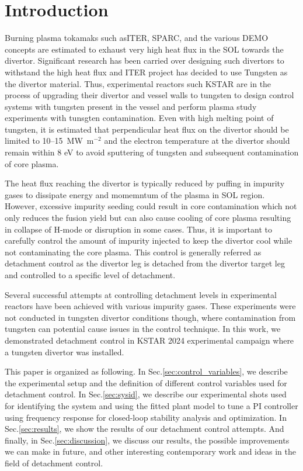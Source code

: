 
\section{Introduction}
\label{sec:introduction}

Burning plasma tokamaks such asITER\cite{Holtkamp_2007_FED}, SPARC\cite{Creely_2020_JPP}, and the various DEMO concepts are estimated to exhaust very high heat flux in the \ac{SOL} towards the divertor. Significant research has been carried over designing such divertors to withstand the high heat flux and ITER project has decided to use Tungsten as the divertor material. Thus, experimental reactors such KSTAR are in the process of upgrading their divertor and vessel walls to tungsten to design control systems with tungsten present in the vessel and perform plasma study experiments with tunsgten contamination. Even with high melting point of tungsten, it is estimated that perpendicular heat flux on the divertor should be limited to 10--15~MW~$\mathrm{m}^{-2}$\cite{pitts_2019_nme} and the electron temperature at the divertor should remain within 8 eV\cite{Brezinsek_2019_NF} to avoid sputtering of tungsten and subsequent contamination of core plasma.

The heat flux reaching the divertor is typically reduced by puffing in impurity gases to dissipate energy and momemntum of the plasma in \ac{SOL} region. However, excessive impurity seeding could result in core contamination which not only reduces the fusion yield but can also cause cooling of core plasma resulting in collapse of H-mode or disruption in some cases. Thus, it is important to carefully control the amount of impurity injected to keep the divertor cool while not contaminating the core plasma. This control is generally referred as detachment control as the divertor leg is detached from the divertor target leg and controlled to a specific level of detachment.

Several successful attempts at controlling detachment levels in experimental reactors have been achieved with various impurity gases\cite{Kallenbach_2012_NF,Ravensbergen_2021_NC, Eldon_2022_PPCF}. These experiments were not conducted in tungsten divertor conditions though, where contamination from tungsten can potential cause issues in the control technique. In this work, we demonstrated detachment control in KSTAR 2024 experimental campaign where a tungsten divertor was installed.

This paper is organized as following. In Sec.\ref{sec:control_variables}, we describe the experimental setup and the definition of different control variables used for detachment control. In Sec.\ref{sec:sysid}, we describe our experimental shots used for identifying the system and using the fitted plant model to tune a PI controller using frequency response for closed-loop stability analysis and optimization. In Sec.\ref{sec:results}, we show the results of our detachment control attempts. And finally, in Sec.\ref{sec:discussion}, we discuss our results, the possible improvements we can make in future, and other interesting contemporary work and ideas in the field of detachment control.